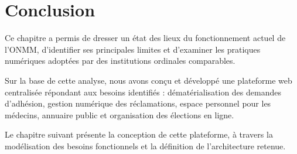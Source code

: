 ﻿\documentclass[12pt,a4paper]{report}
\begin{document}







\section{Conclusion}

Ce chapitre a permis de dresser un état des lieux du fonctionnement
actuel de l'ONMM, d'identifier ses principales limites et d'examiner
les pratiques numériques adoptées par des institutions ordinales
comparables.

Sur la base de cette analyse, nous avons conçu et développé une
plateforme web centralisée répondant aux besoins identifiés :
dématérialisation des demandes d'adhésion, gestion numérique des
réclamations, espace personnel pour les médecins, annuaire public
et organisation des élections en ligne.

Le chapitre suivant présente la conception de cette plateforme,
à travers la modélisation des besoins fonctionnels et la définition
de l'architecture retenue.
\end{document}
